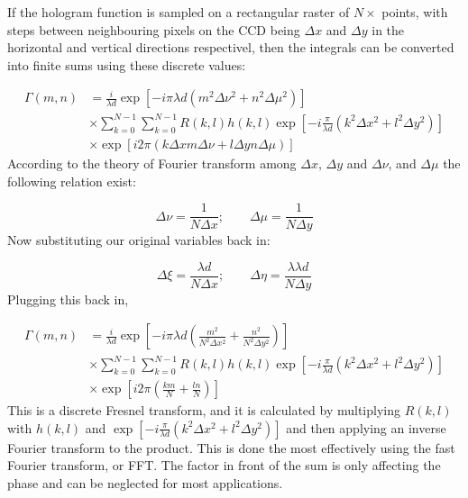     If the hologram function is sampled on a rectangular raster of $N\times $
    points, with steps between neighbouring pixels on the CCD being $\Delta x$ and $\Delta
    y$ in the horizontal and vertical directions respectivel, then the
    integrals can be converted into finite sums using these discrete values:

    \begin{align}
        \Gamma(m,n) &= \frac{i}{\lambda d}\exp\left[ -i\pi \lambda d\left(
            m^2\Delta \nu^2 + n^2\Delta \mu^2
        \right)\right]\\
        & \times
        \sum_{k=0}^{N-1}\sum_{k=0}^{N-1}R(k,l)h(k,l)\exp\left[ -i
        \frac{\pi}{\lambda d}\left( k^2\Delta x^2+l^2\Delta y^2 \right)
    \right] \\
    & \times \exp\left[ i2\pi\left( k\Delta x m \Delta\nu+l\Delta y n
    \Delta\mu \right) \right]
    \end{align}
    According to the theory of Fourier transform among $\Delta x$, $\Delta y$
    and $\Delta\nu$, and $\Delta\mu$ the following relation exist:

    \begin{equation}
        \Delta\nu=\frac{1}{N\Delta x}; \qquad \Delta\mu=\frac{1}{N\Delta y}
    \end{equation}
    Now substituting our original variables back in:

    \begin{equation}
        \Delta\xi=\frac{\lambda d}{N\Delta x}; \qquad \Delta\eta=\frac{\lambda
        \lambda d}{N\Delta y}
    \end{equation}
    Plugging this back in,

    \begin{align}
        \Gamma(m,n) & = \frac{i}{\lambda d}\exp\left[ -i\pi \lambda d\left(
            \frac{m^2}{N^2\Delta x^2}+\frac{n^2}{N^2\Delta y^2}
        \right)\right]\\
        &\times
        \sum_{k=0}^{N-1}\sum_{k=0}^{N-1}R(k,l)h(k,l)\exp\left[ -i
        \frac{\pi}{\lambda d}\left( k^2\Delta x^2+l^2\Delta y^2 \right)
    \right] \\
    &\times \exp\left[ i2\pi\left( \frac{km}{N}+\frac{ln}{N} \right) \right]
    \end{align}
    This is a discrete Fresnel transform, and it is calculated by multiplying
    $R(k,l)$ with $h(k,l)$ and $\exp\left[ -i
        \frac{\pi}{\lambda d}\left( k^2\Delta x^2+l^2\Delta y^2 \right)
    \right]$
    and then applying an inverse Fourier transform to the product. This is done
    the most effectively using the fast Fourier transform, or FFT\@. The factor
    in front of the sum is only affecting the phase and can be neglected for
    most applications.


